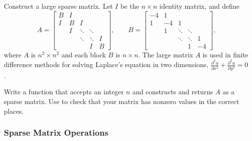\begin{problem}{Construct a large sparse matrix.}
Let $I$ be the $n\times n$ identity matrix, and define
\[
A =\left[\begin{array}{ccccc}
B & I &      &        & \\
I & B &  I   &        & \\
  & I & \ddots & \ddots & \\
  &   & \ddots & \ddots & I \\
  &   &        &    I   & B
\end{array}\right],
\qquad
B = \left[\begin{array}{rrrrr}
-4 &  1 &      &        & \\
 1 & -4 &  1   &        & \\
   &  1 & \ddots & \ddots & \\
   &    & \ddots & \ddots & 1 \\
   &    &        &    1   & -4
\end{array}\right],
\]
where $A$ is $n^2\times n^2$ and each block $B$ is $n\times n$.
The large matrix $A$ is used in finite difference methods for solving Laplace's equation in two dimensions, $\frac{\partial^2u}{\partial x^2} + \frac{\partial^2u}{\partial y^2} = 0$.

Write a function that accepts an integer $n$ and constructs and returns $A$ as a sparse matrix.
Use  to check that your matrix has nonzero values in the correct places.
\label{prob:sparse-construction}
\end{problem}

\subsubsection*{Sparse Matrix Operations} %

